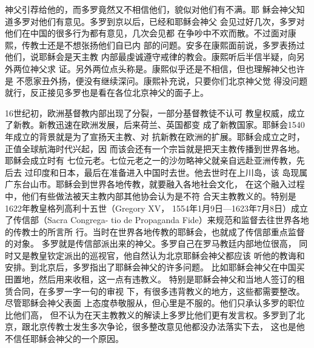神父引荐给他的，而多罗竟然又不相信他们，貌似对他们有不满。耶%
稣会神父知道多罗对他们有意见。多罗到京以后，已经和耶稣会神父%
会见过好几次，多罗对他们在中国的很多行为都有意见，几次会见都%
在争吵中不欢而散。不过面对康熙，传教士还是不想张扬他们自已内%
部的问题。安多在康熙面前说，多罗表扬过他们，说耶稣会是天主教%
内部最虔诚遵守戒律的教会。康熙听后半信半疑，向另外两位神父求%
证。另外两位点头称是。康熙似乎还是不相信，但也理解神父也许是%
不愿家丑外扬，便没有继续深问。康熙补充说，只要你们北京神父觉%
得没问题就行，反正接见多罗也是看在各位北京神父的面子上。%
\par
16世纪初，欧洲基督教内部出现了分裂，一部分基督教徒不认可%
教皇权威，成立了新教。新教迅速在欧洲发展，后来荷兰、英国都变%
成了新教国家。耶稣会1540年成立的背景就是为了宣扬天主教、对%
抗新教在欧洲的扩展。耶稣会成立之时，正值全球航海时代兴起，因%
而该会还有一个宗旨就是把天主教传播到世界各地。耶稣会成立时有%
七位元老。七位元老之一的沙勿略神父就亲自远赴亚洲传教，先后去%
过印度和日本，最后在准备进入中国时去世。他去世时在上川岛，该%
岛现属广东台山市。耶稣会到世界各地传教，就要融入各地社会文化，%
在这个融入过程中，他们有些做法被天主教内部其他协会认为是不符%
合天主教教义的。特别是1622年教皇格列高利十五世（Gregory XV，%
1554年1月9日—1623年7月8日）成立了传信部（Sacra Congrega-%
tio de Propaganda Fide）来规范和监督去往世界各地的传教士的所言所%
行。当时在世界各地传教的耶稣会，也就成了传信部重点监督的对象。%
多罗就是传信部派出来的神父。多罗自己在罗马教廷内部地位很高，%
同时又是教皇钦定派出的巡视官，他自然认为北京耶稣会神父都应该%
听他的教诲和安排。到北京后，多罗指出了耶稣会神父的许多问题。%
比如耶稣会神父在中国买田置地，然后用来收租，这一点有违教义。%
特别是耶稣会神父和当地人签订的租赁合同，在多罗一字一句的审视%
下，有很多违背教义的地方，这些都需要整改。尽管耶稣会神父表面%
上态度恭敬服从，但心里是不服的。他们只承认多罗的职位比他们高，%
但不认为在天主教教义的解读上多罗比他们更有发言权。多罗到了北%
京，跟北京传教士发生多次争论，很多整改意见他都没办法落实下去，%
这也是他不信任耶稣会神父的一个原因。%

